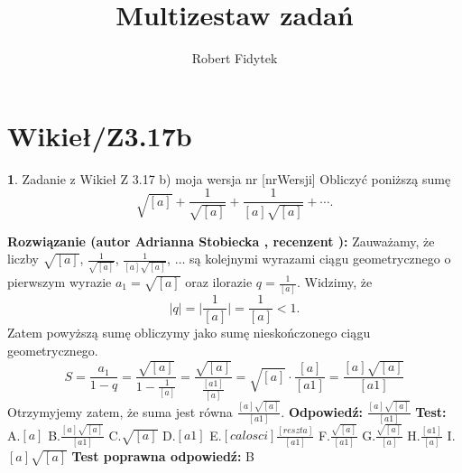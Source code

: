 \documentclass[12pt, a4paper]{article}
\title{Multizestaw zadań}
\author{Robert Fidytek}
\date{}
\theoremstyle{definition} %
\newtheorem{zad}{}
\newcommand{\kategoria}[1]{\section{#1}} %
\newcommand{\zadStart}[1]{\begin{zad}#1\newline} %
\newcommand{\zadStop}{\end{zad}}   %
\newcommand{\rozwStart}[2]{\noindent \textbf{Rozwiązanie (autor #1 , recenzent #2): }\newline} %
\newcommand{\rozwStop}{\newline}                                            %
\newcommand{\odpStart}{\noindent \textbf{Odpowiedź:}\newline}    %
\newcommand{\odpStop}{\newline}                                             %
\newcommand{\testStart}{\noindent \textbf{Test:}\newline} %
\newcommand{\testStop}{\newline} %
\newcommand{\kluczStart}{\noindent \textbf{Test poprawna odpowiedź:}\newline} %
\newcommand{\kluczStop}{\newline} %
\begin{document}
\maketitle


\kategoria{Wikieł/Z3.17b}
\zadStart{Zadanie z Wikieł Z 3.17 b) moja wersja nr [nrWersji]}
Obliczyć poniższą sumę
$$\sqrt{[a]}+\frac{1}{\sqrt{[a]}}+\frac{1}{[a]\sqrt{[a]}}+\cdots.$$
\zadStop
\rozwStart{Adrianna Stobiecka}{}
Zauważamy, że liczby $\sqrt{[a]}$, $\frac{1}{\sqrt{[a]}}$, $\frac{1}{[a]\sqrt{[a]}}$, $\dots$ są kolejnymi wyrazami ciągu geometrycznego o pierwszym wyrazie $a_1=\sqrt{[a]}$ oraz ilorazie $q=\frac{1}{[a]}$. Widzimy, że 
$$|q|=\bigg|\frac{1}{[a]}\bigg|=\frac{1}{[a]}<1.$$
Zatem powyższą sumę obliczymy jako sumę nieskończonego ciągu geometrycznego.
$$S=\frac{a_1}{1-q}=\frac{\sqrt{[a]}}{1-\frac{1}{[a]}}=\frac{\sqrt{[a]}}{\frac{[a1]}{[a]}}=\sqrt{[a]}\cdot\frac{[a]}{[a1]}=\frac{[a]\sqrt{[a]}}{[a1]}$$
Otrzymyjemy zatem, że suma jest równa $\frac{[a]\sqrt{[a]}}{[a1]}$.
\rozwStop
\odpStart
$\frac{[a]\sqrt{[a]}}{[a1]}$
\odpStop
\testStart
A.$[a]$
B.$\frac{[a]\sqrt{[a]}}{[a1]}$
C.$\sqrt{[a]}$
D.$[a1]$
E.$[calosci]\frac{[reszta]}{[a1]}$
F.$\frac{\sqrt{[a]}}{[a1]}$
G.$\frac{\sqrt{[a]}}{[a]}$
H.$\frac{[a1]}{[a]}$
I.$[a]\sqrt{[a]}$
\testStop
\kluczStart
B
\kluczStop
\end{document}
